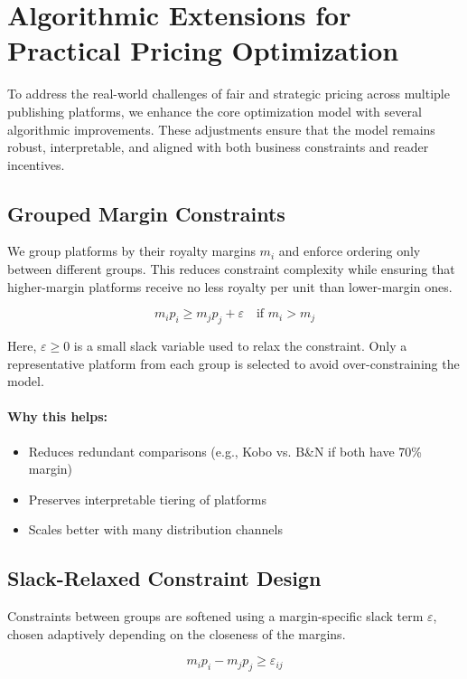 \section{Algorithmic Extensions for Practical Pricing Optimization}

To address the real-world challenges of fair and strategic pricing across multiple publishing platforms, we enhance the core optimization model with several algorithmic improvements. These adjustments ensure that the model remains robust, interpretable, and aligned with both business constraints and reader incentives.

\subsection{Grouped Margin Constraints}

We group platforms by their royalty margins \( m_i \) and enforce ordering only between different groups. This reduces constraint complexity while ensuring that higher-margin platforms receive no less royalty per unit than lower-margin ones.

\[
m_i p_i \geq m_j p_j + \varepsilon \quad \text{if } m_i > m_j
\]

Here, \( \varepsilon \geq 0 \) is a small slack variable used to relax the constraint. Only a representative platform from each group is selected to avoid over-constraining the model.

\paragraph{Why this helps:}
\begin{itemize}
    \item Reduces redundant comparisons (e.g., Kobo vs. B\&N if both have 70\% margin)
    \item Preserves interpretable tiering of platforms
    \item Scales better with many distribution channels
\end{itemize}

\subsection{Slack-Relaxed Constraint Design}

Constraints between groups are softened using a margin-specific slack term \( \varepsilon \), chosen adaptively depending on the closeness of the margins.

\[
m_i p_i - m_j p_j \geq \varepsilon_{ij}
\]

